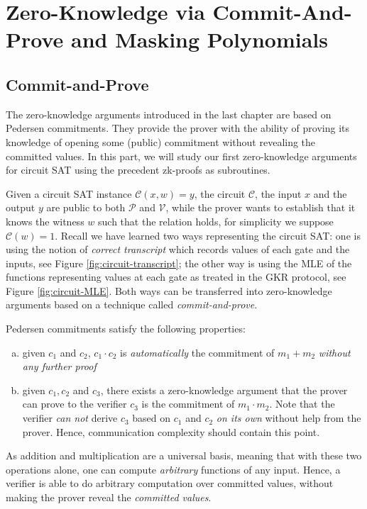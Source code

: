 \documentclass{article}
\begin{document}
\section{Zero-Knowledge via Commit-And-Prove and Masking Polynomials}

\subsection{Commit-and-Prove}

The zero-knowledge arguments introduced in the last chapter are based on Pedersen commitments. They provide the prover with the ability of proving its knowledge of opening some (public) commitment without revealing the committed values. In this part, we will study our first zero-knowledge arguments for circuit SAT using the precedent zk-proofs as subroutines. 

Given a circuit SAT instance $\mathcal{C}(x, w) = y$, the circuit $\mathcal{C}$, the input $x$ and the output $y$ are public to both $\mathcal{P}$ and $\mathcal{V}$, while the prover wants to establish that it knows the witness $w$ such that the relation holds, for simplicity we suppose $\mathcal{C}(w) = 1$. Recall we have learned two ways representing the circuit SAT: one is using the notion of \textit{correct transcript} which records values of each gate and the inputs, see Figure \ref{fig:circuit-transcript}; the other way is using the MLE of the functions representing values at each gate as treated in the GKR protocol, see Figure \ref{fig:circuit-MLE}. Both ways can be transferred into zero-knowledge arguments based on a technique called \textit{commit-and-prove}. 

Pedersen commitments satisfy the following properties: 
\begin{enumerate}[(a)]
\item\label{item:65} given $c_1$ and $c_2$, $c_1 \cdot c_2$ is \textit{automatically} the commitment of $m_1 + m_2$ \textit{without any further proof}
\item\label{item:66} given $c_1, c_2$ and $c_3$, there exists a zero-knowledge argument that the prover can prove to the verifier $c_3$ is the commitment of $m_1 \cdot m_2$. Note that the verifier \textit{can not} derive $c_3$ based on $c_1$ and $c_2$ \textit{on its own} without help from the prover. Hence, communication complexity should contain this point. 
\end{enumerate}
As addition and multiplication are a universal basis, meaning that with these two operations alone, one can compute \textit{arbitrary} functions of any input. Hence, a verifier is able to do arbitrary computation over committed values, without making the prover reveal the \textit{committed values}. 
\end{document}
